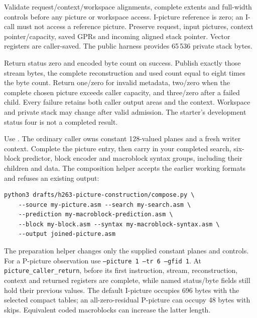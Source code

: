 Validate request/context/workspace alignments, complete extents and full-width
controls before any picture or workspace access. I-picture reference is zero;
an I-call must not access a reference picture. Preserve request, input pictures,
context pointer/capacity, saved GPRs and incoming aligned stack pointer. Vector
registers are caller-saved. The public harness provides 65\,536 private stack bytes.

Return status zero and encoded byte count on success. Publish exactly those
stream bytes, the complete reconstruction and used count equal to eight times
the byte count. Return one/zero for invalid metadata, two/zero when the complete
chosen picture exceeds caller capacity, and three/zero after a failed child.
Every failure retains both caller output areas and the context. Workspace and
private stack may change after valid admission. The starter's development status
four is not a completed result.

Use . The ordinary caller owns
constant 128-valued planes and a fresh writer context. Complete the picture entry,
then carry in your completed search, six-block predictor, block encoder and
macroblock syntax groups, including their children and data. The composition
helper accepts the earlier working formats and refuses an existing output:
\begin{verbatim}
python3 drafts/h263-picture-construction/compose.py \
    --source my-picture.asm --search my-search.asm \
    --prediction my-macroblock-prediction.asm \
    --block my-block.asm --syntax my-macroblock-syntax.asm \
    --output joined-picture.asm
\end{verbatim}
The preparation helper changes only the supplied constant planes and controls.
For a P-picture observation use \texttt{--picture 1 --tr 6 --gfid 1}. At
\texttt{picture\_caller\_return}, before its first instruction, stream, reconstruction,
context and returned registers are complete, while named status/byte fields still
hold their previous values. The default I-picture occupies 696 bytes with the
selected compact tables; an all-zero-residual P-picture can occupy 48 bytes with
skips. Equivalent coded macroblocks can increase the latter length.
